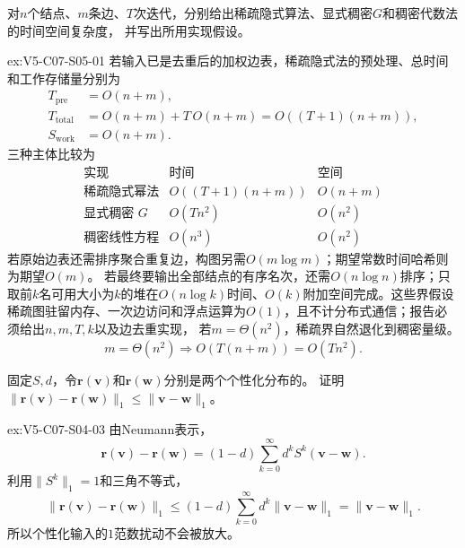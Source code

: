 \begin{SLChapterExercisePairSection}
\begin{exercise}\label{ex:V5-C07-S05-01}
对$n$个结点、$m$条边、$T$次迭代，分别给出稀疏隐式算法、显式稠密$G$和稠密代数法的时间空间复杂度，
并写出所用实现假设。
\end{exercise}
\ifSLFullEdition
{}\label{sol:V5-C07-S05-01}
\begin{chapterexercisesolution}{ex:V5-C07-S05-01}
若输入已是去重后的加权边表，稀疏隐式法的预处理、总时间和工作存储量分别为
\[
\begin{aligned}
T_{\mathrm{pre}}&=O(n+m),\\
T_{\mathrm{total}}&=O(n+m)+T\,O(n+m)=O((T+1)(n+m)),\\
S_{\mathrm{work}}&=O(n+m).
\end{aligned}
\]
三种主体比较为
\[
\begin{array}{c|c|c}
\text{实现}&\text{时间}&\text{空间}\\\hline
\text{稀疏隐式幂法}&O((T+1)(n+m))&O(n+m)\\
\text{显式稠密 }G&O(Tn^2)&O(n^2)\\
\text{稠密线性方程}&O(n^3)&O(n^2)
\end{array}
\]
若原始边表还需排序聚合重复边，构图另需$O(m\log m)$；期望常数时间哈希则为期望$O(m)$。
若最终要输出全部结点的有序名次，还需$O(n\log n)$排序；只取前$k$名可用大小为$k$的堆在$O(n\log k)$时间、$O(k)$附加空间完成。这些界假设稀疏图驻留内存、一次边访问和浮点运算为$O(1)$，且不计分布式通信；报告必须给出$n,m,T,k$以及边去重实现，
若$m=\Theta(n^2)$，稀疏界自然退化到稠密量级。
\[
m=\Theta(n^2)\Longrightarrow O(T(n+m))=O(Tn^2).
\]
\end{chapterexercisesolution}
\fi

\begin{exercise}\label{ex:V5-C07-S04-03}
固定$S,d$，令$\boldsymbol r(\boldsymbol v)$和$\boldsymbol r(\boldsymbol w)$分别是两个个性化分布的\PageRank{}。
证明$\|\boldsymbol r(\boldsymbol v)-\boldsymbol r(\boldsymbol w)\|_1
\le\|\boldsymbol v-\boldsymbol w\|_1$。
\end{exercise}
\ifSLFullEdition
{}\label{sol:V5-C07-S04-03}
\begin{chapterexercisesolution}{ex:V5-C07-S04-03}
由Neumann表示，
\[
\boldsymbol r(\boldsymbol v)-\boldsymbol r(\boldsymbol w)
=(1-d)\sum_{k=0}^{\infty}d^kS^k(\boldsymbol v-\boldsymbol w).
\]
利用$\|S^k\|_1=1$和三角不等式，
\[
\|\boldsymbol r(\boldsymbol v)-\boldsymbol r(\boldsymbol w)\|_1
\le(1-d)\sum_{k=0}^{\infty}d^k
\|\boldsymbol v-\boldsymbol w\|_1
=\|\boldsymbol v-\boldsymbol w\|_1.
\]
所以个性化输入的$1$范数扰动不会被放大。
\end{chapterexercisesolution}
\fi


\end{SLChapterExercisePairSection}
